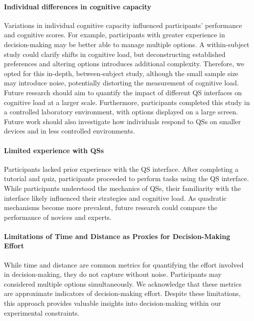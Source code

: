 \paragraph{Individual differences in cognitive capacity}
Variations in individual cognitive capacity influenced participants' performance and cognitive scores. For example, participants with greater experience in decision-making may be better able to manage multiple options.  A within-subject study could clarify shifts in cognitive load, but deconstructing established preferences and altering options introduces additional complexity. Therefore, we opted for this in-depth, between-subject study, although the small sample size may introduce noise, potentially distorting the measurement of cognitive load. Future research should aim to quantify the impact of different QS interfaces on cognitive load at a larger scale. Furthermore, participants completed this study in a controlled laboratory environment, with options displayed on a large screen. Future work should also investigate how individuals respond to QSs on smaller devices and in less controlled environments.

\paragraph{Limited experience with QSs}
Participants lacked prior experience with the QS interface. After completing a tutorial and quiz, participants proceeded to perform tasks using the QS interface. While participants understood the mechanics of QSs, their familiarity with the interface likely influenced their strategies and cognitive load. As quadratic mechanisms become more prevalent, future research could compare the performance of novices and experts.

\paragraph{Limitations of Time and Distance as Proxies for Decision-Making Effort}
While time and distance are common metrics for quantifying the effort involved in decision-making, they do not capture without noise. Participants may considered multiple options simultaneously. We acknowledge that these metrics are approximate indicators of decision-making effort. Despite these limitations, this approach provides valuable insights into decision-making within our experimental constraints.